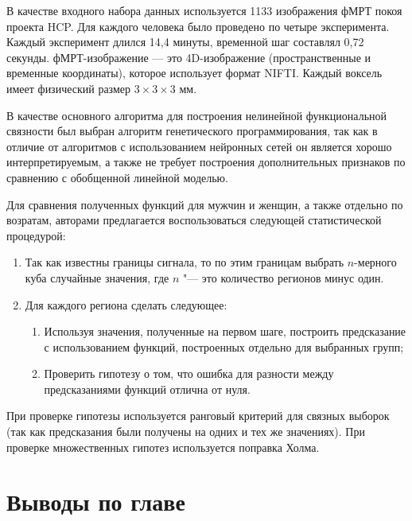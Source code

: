 В качестве входного набора данных используется 1133 изображения фМРТ покоя проекта HCP. Для каждого человека было проведено по четыре эксперимента. Каждый эксперимент длился 14,4 минуты, временной шаг составлял 0,72 секунды. фМРТ-изображение — это 4D-изображение (пространственные и временные координаты), которое использует формат NIFTI. Каждый воксель имеет физический размер $3\times 3 \times 3$ мм.

В качестве основного алгоритма для построения нелинейной функциональной связности был выбран алгоритм генетического программирования, так как в отличие от алгоритмов с использованием нейронных сетей он является хорошо интерпретируемым, а также не требует построения дополнительных признаков по сравнению с обобщенной линейной моделью.


Для сравнения полученных функций для мужчин и женщин, а также отдельно по возратам, авторами предлагается воспользоваться следующей статистической процедурой:

\begin{enumerate}
    \item Так как известны границы сигнала, то по этим границам выбрать $n$-мерного куба случайные значения, где $n$ "--- это количество регионов минус один.
    \item Для каждого региона сделать следующее:
    \begin{enumerate}
        \item Используя значения, полученные на первом шаге, построить предсказание с использованием функций, построенных отдельно для выбранных групп;
        \item Проверить гипотезу о том, что ошибка для разности между предсказаниями функций отлична от нуля.
    \end{enumerate}
\end{enumerate}

При проверке гипотезы используется ранговый критерий для связных выборок (так как предсказания были получены на одних и тех же значениях). При проверке множественных гипотез используется поправка Холма.


\section{Выводы по главе}\label{sect4_3}

